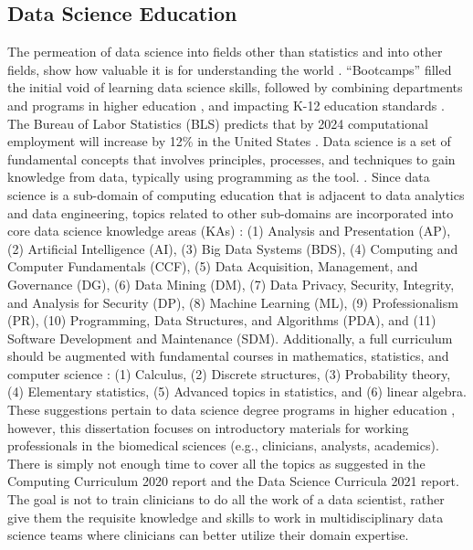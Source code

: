 \documentclass[010-intro.tex]{subfiles}
\begin{document}
\subsection{Data Science Education}

    The permeation of data science into fields other than statistics and into other fields,
    show how valuable it is for understanding the world
    \cite{clevelandDataScienceAction2001}.
    ``Bootcamps'' filled the initial void of learning data science skills,
    followed by combining departments and programs in higher education
    \cite{krossDemocratizationDataScience2020},
    and impacting K-12 education standards
    \cite{csta}.
    The Bureau of Labor Statistics (BLS)
    predicts that by 2024 computational employment will increase by 12\% in the United States
    \cite{cc2020}. %
    Data science is a set of fundamental concepts that involves
    principles, processes, and techniques to gain knowledge from data, typically using programming as the tool.
    \cite{cc2020, ccdsc2021, provostDataScienceBusiness2013}.
    Since data science is a sub-domain of computing education that is adjacent to data analytics and data engineering,
    topics related to other sub-domains are incorporated into core data science knowledge areas (KAs)
    \cite{cc2020, ccdsc2021}:
    (1) Analysis and Presentation (AP),
    (2) Artificial Intelligence (AI),
    (3) Big Data Systems (BDS),
    (4) Computing and Computer Fundamentals (CCF),
    (5) Data Acquisition, Management, and Governance (DG),
    (6) Data Mining (DM),
    (7) Data Privacy, Security, Integrity, and Analysis for Security (DP),
    (8) Machine Learning (ML),
    (9) Professionalism (PR),
    (10) Programming, Data Structures, and Algorithms (PDA), and
    (11) Software Development and Maintenance (SDM).
    Additionally, a full curriculum should be augmented with fundamental courses in
    mathematics, statistics, and computer science
    \cite{cc2020, ccdsc2021}:
    (1) Calculus,
    (2) Discrete structures,
    (3) Probability theory,
    (4) Elementary statistics,
    (5) Advanced topics in statistics, and
    (6) linear algebra.
    These suggestions pertain to data science degree programs in higher education
    \cite{cc2020, ccdsc2021},
    however, this dissertation focuses on introductory materials for working professionals in the biomedical sciences
    (e.g., clinicians, analysts, academics).
    There is simply not enough time to cover all the topics as suggested in the
    Computing Curriculum 2020 report and the Data Science Curricula 2021 report.
    The goal is not to train clinicians to do all the work of a data scientist,
    rather give them the requisite knowledge and skills to work in multidisciplinary data science teams
    where clinicians can better utilize their domain expertise.

\end{document}
